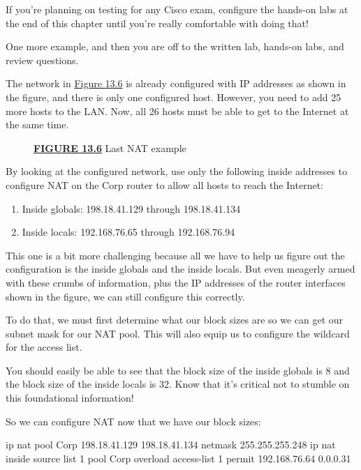 \begin{note}
If you're planning on testing for any Cisco exam, configure the hands-on labs at the end of this chapter until you're really comfortable with doing that!
\end{note}

One more example, and then you are off to the written lab, hands-on
labs, and review questions.

The network in
\protect\hyperlink{c13.xhtmlux5cux23figure13-6}{Figure 13.6} is already
configured with IP addresses as shown in the figure, and there is only
one configured host. However, you need to add 25 more hosts to the LAN.
Now, all 26 hosts must be able to get to the Internet at the same time.

\begin{figure}
\centering
\caption{{\protect\hyperlink{c13.xhtmlux5cux23figureanchor13-6}{\textbf{FIGURE
13.6}} Last NAT example}}
\end{figure}

By looking at the configured network, use only the following inside
addresses to configure NAT on the Corp router to allow all hosts to
reach the Internet:

\begin{enumerate}
\item
  Inside globals: 198.18.41.129 through 198.18.41.134
\item
  Inside locals: 192.168.76.65 through 192.168.76.94
\end{enumerate}

This one is a bit more challenging because all we have to help us figure
out the configuration is the inside globals and the inside locals. But
even meagerly armed with these crumbs of information, plus the IP
addresses of the router interfaces shown in the figure, we can still
configure this correctly.

To do that, we must first determine what our block sizes are so we can
get our subnet mask for our NAT pool. This will also equip us to
configure the wildcard for the access list.

You should easily be able to see that the block size of the inside
globals is 8 and the block size of the inside locals is 32. Know that
it's critical not to stumble on this foundational information!

So we can configure NAT now that we have our block sizes:

\begin{cli}
ip nat pool Corp 198.18.41.129 198.18.41.134 netmask 255.255.255.248
ip nat inside source list 1 pool Corp overload
access-list 1 permit 192.168.76.64 0.0.0.31
\end{cli}

